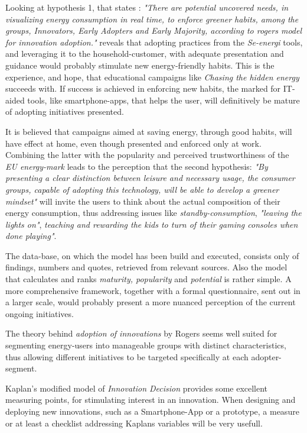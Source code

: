 \documentclass[journal]{IEEEtran}
\begin{document}
Looking at hypothesis 1, that states :
\textit{"There are potential uncovered needs, in visualizing energy consumption in real time, to enforce greener habits, among the groups, Innovators, Early Adopters and Early Majority, according to rogers model for innovation adoption."}
reveals that adopting practices from the \textit{Se-energi} tools, and leveraging it to the household-customer, with adequate presentation and guidance would probably stimulate new energy-friendly habits. This is the experience, and hope, that educational campaigns like \textit{Chasing the hidden energy} succeeds with.
If success is achieved in enforcing new habits, the marked for IT-aided tools, like smartphone-apps, that helps the user, will definitively be mature of adopting initiatives presented.  

It is believed that campaigns aimed at saving energy, through good habits, will have effect at home, even though presented and enforced only at work. Combining the latter with the popularity and perceived trustworthiness of the \textit{EU energy-mark} leads to the perception that the second hypothesis: 
\textit{"By presenting a clear distinction between leisure and necessary usage, the consumer groups, capable of adopting this technology, will be able to develop a greener mindset"} will invite the users to think about the actual composition of their energy consumption, thus addressing issues like \textit{standby-consumption}, \textit{"leaving the lights on"}, \textit{teaching and rewarding the kids to turn of their gaming consoles when done playing"}. \newline

The data-base, on which the model has been build and executed, consists only of findings, numbers and quotes, retrieved from relevant sources. Also the model that calculates and ranks \textit{maturity, popularity} and \textit{potential} is rather simple. A more comprehensive framework, together with a formal questionnaire, sent out in a larger scale, would probably present a more nuanced perception of the current ongoing initiatives.

The theory behind \textit{adoption of innovations} by Rogers seems well suited for segmenting energy-users into manageable groups with distinct characteristics, thus allowing different initiatives to be targeted specifically at each adopter-segment.

Kaplan's modified model of \textit{Innovation Decision} provides some excellent measuring points, for stimulating interest in an innovation. When designing and deploying new innovations, such as a Smartphone-App or a prototype, a measure or at least a checklist addressing Kaplans variables will be very usefull.
\end{document}
